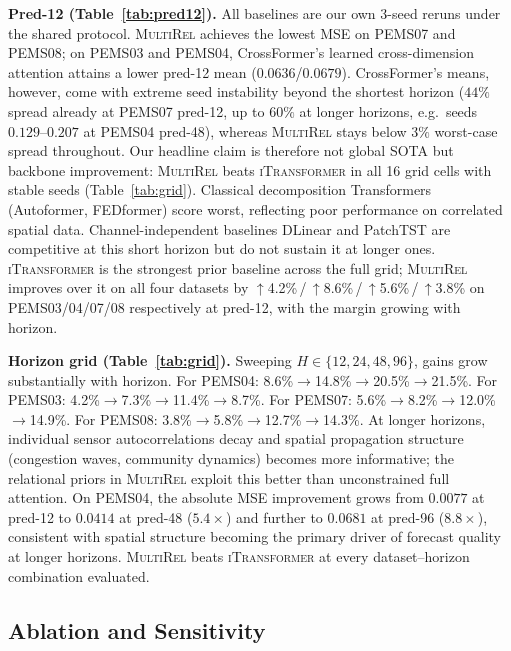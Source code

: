 \documentclass[letterpaper]{article}   %
\newcommand{\mr}{\textsc{MultiRel}}
\newcommand{\itrans}{\textsc{iTransformer}}
\begin{document}
\label{sec:mainresults}

\textbf{Pred-12 (Table~\ref{tab:pred12}).}
All baselines are our own 3-seed reruns under the shared protocol.
\mr{} achieves the lowest MSE on PEMS07 and PEMS08; on PEMS03 and PEMS04,
CrossFormer's learned cross-dimension attention attains a lower pred-12 mean
($0.0636$/$0.0679$). CrossFormer's means, however, come with extreme seed
instability beyond the shortest horizon ($44\%$ spread already at PEMS07
pred-12, up to $60\%$ at longer horizons, e.g.\ seeds $0.129$--$0.207$ at
PEMS04 pred-48), whereas \mr{} stays below $3\%$ worst-case spread
throughout. Our headline claim is therefore not global SOTA but backbone
improvement: \mr{} beats \itrans{} in all 16 grid cells with stable seeds
(Table~\ref{tab:grid}).
Classical decomposition Transformers (Autoformer, FEDformer) score worst,
reflecting poor performance on correlated spatial data.
Channel-independent baselines DLinear and PatchTST are competitive at this
short horizon but do not sustain it at longer ones.
\itrans{} is the strongest prior baseline across the full grid; \mr{}
improves over it on all four datasets by
$\uparrow$4.2\%\,/\,$\uparrow$8.6\%\,/\,$\uparrow$5.6\%\,/\,$\uparrow$3.8\%
on PEMS03/04/07/08 respectively at pred-12, with the margin growing with
horizon.



\textbf{Horizon grid (Table~\ref{tab:grid}).}
Sweeping $H\in\{12,24,48,96\}$, gains grow substantially with horizon.
For PEMS04: 8.6\%$\!\to\!$14.8\%$\!\to\!$20.5\%$\!\to\!$21.5\%.
For PEMS03: 4.2\%$\!\to\!$7.3\%$\!\to\!$11.4\%$\!\to\!$8.7\%.
For PEMS07: 5.6\%$\!\to\!$8.2\%$\!\to\!$12.0\%$\!\to\!$14.9\%.
For PEMS08: 3.8\%$\!\to\!$5.8\%$\!\to\!$12.7\%$\!\to\!$14.3\%.
At longer horizons, individual sensor autocorrelations decay and spatial
propagation structure (congestion waves, community dynamics) becomes more
informative; the relational priors in \mr{} exploit this better than unconstrained
full attention.
On PEMS04, the absolute MSE improvement grows from $0.0077$ at pred-12 to
$0.0414$ at pred-48 ($5.4\times$) and further to $0.0681$ at pred-96 ($8.8\times$),
consistent with spatial structure becoming the primary driver of forecast quality
at longer horizons.
\mr{} beats \itrans{} at every dataset--horizon combination evaluated.



\subsection{Ablation and Sensitivity}
\label{sec:ablation}
\end{document}
